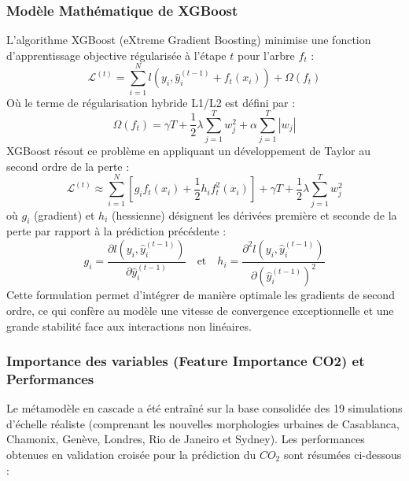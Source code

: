 \documentclass[11pt, a4paper]{article}
\begin{document}
\subsubsection{Modèle Mathématique de
XGBoost}\label{moduxe8le-mathuxe9matique-de-xgboost}

L'algorithme XGBoost (eXtreme Gradient Boosting) minimise une fonction
d'apprentissage objective régularisée à l'étape \(t\) pour l'arbre
\(f_t\) :
\[\mathcal{L}^{(t)} = \sum_{i=1}^N l\left(y_i, \hat{y}_i^{(t-1)} + f_t(x_i)\right) + \Omega(f_t)\]
Où le terme de régularisation hybride L1/L2 est défini par :
\[\Omega(f_t) = \gamma T + \frac{1}{2} \lambda \sum_{j=1}^T w_j^2 + \alpha \sum_{j=1}^T |w_j|\]
XGBoost résout ce problème en appliquant un développement de Taylor au
second ordre de la perte :
\[\mathcal{L}^{(t)} \approx \sum_{i=1}^N \left[ g_i f_t(x_i) + \frac{1}{2} h_i f_t^2(x_i) \right] + \gamma T + \frac{1}{2} \lambda \sum_{j=1}^T w_j^2\]
où \(g_i\) (gradient) et \(h_i\) (hessienne) désignent les dérivées
première et seconde de la perte par rapport à la prédiction précédente :
\[g_i = \frac{\partial l\left(y_i, \hat{y}_i^{(t-1)}\right)}{\partial \hat{y}_i^{(t-1)}} \quad \text{et} \quad h_i = \frac{\partial^2 l\left(y_i, \hat{y}_i^{(t-1)}\right)}{\partial \left(\hat{y}_i^{(t-1)}\right)^2}\]
Cette formulation permet d'intégrer de manière optimale les gradients de
second ordre, ce qui confère au modèle une vitesse de convergence
exceptionnelle et une grande stabilité face aux interactions non
linéaires.

\subsubsection{Importance des variables (Feature Importance CO2) et
Performances}\label{importance-des-variables-feature-importance-co2-et-performances}

Le métamodèle en cascade a été entraîné sur la base consolidée des 19
simulations d'échelle réaliste (comprenant les nouvelles morphologies
urbaines de Casablanca, Chamonix, Genève, Londres, Rio de Janeiro et
Sydney). Les performances obtenues en validation croisée pour la
prédiction du \(CO_2\) sont résumées ci-dessous :
\end{document}
